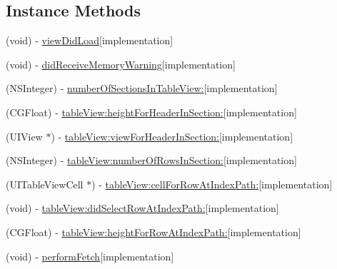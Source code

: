 \subsection*{Instance Methods}
\begin{DoxyCompactItemize}
\item 
(void) -\/ \hyperlink{interface_medikamente_view_controller_ad495861d765867a533e7f57bb0c7ddeb}{view\+Did\+Load}{\ttfamily  \mbox{[}implementation\mbox{]}}
\item 
(void) -\/ \hyperlink{interface_medikamente_view_controller_a272c41cc6dc63b30f8714e8e787748e0}{did\+Receive\+Memory\+Warning}{\ttfamily  \mbox{[}implementation\mbox{]}}
\item 
(N\+S\+Integer) -\/ \hyperlink{interface_medikamente_view_controller_a1917223546d3ea554f347dfe4c6abf9f}{number\+Of\+Sections\+In\+Table\+View\+:}{\ttfamily  \mbox{[}implementation\mbox{]}}
\item 
(C\+G\+Float) -\/ \hyperlink{interface_medikamente_view_controller_a1fdfccfb526b24d462ece625af788b61}{table\+View\+:height\+For\+Header\+In\+Section\+:}{\ttfamily  \mbox{[}implementation\mbox{]}}
\item 
(U\+I\+View $\ast$) -\/ \hyperlink{interface_medikamente_view_controller_ab2f59dbc2ceab3b47584584cf67bd88b}{table\+View\+:view\+For\+Header\+In\+Section\+:}{\ttfamily  \mbox{[}implementation\mbox{]}}
\item 
(N\+S\+Integer) -\/ \hyperlink{interface_medikamente_view_controller_a814c4474f1de97789160edf42be07675}{table\+View\+:number\+Of\+Rows\+In\+Section\+:}{\ttfamily  \mbox{[}implementation\mbox{]}}
\item 
(U\+I\+Table\+View\+Cell $\ast$) -\/ \hyperlink{interface_medikamente_view_controller_acfb639b65d34f1019a28065a8aaa8858}{table\+View\+:cell\+For\+Row\+At\+Index\+Path\+:}{\ttfamily  \mbox{[}implementation\mbox{]}}
\item 
(void) -\/ \hyperlink{interface_medikamente_view_controller_af096d0035878c4de7bf01051c6eeae91}{table\+View\+:did\+Select\+Row\+At\+Index\+Path\+:}{\ttfamily  \mbox{[}implementation\mbox{]}}
\item 
(C\+G\+Float) -\/ \hyperlink{interface_medikamente_view_controller_a2980ba60a26329314b8825018955b454}{table\+View\+:height\+For\+Row\+At\+Index\+Path\+:}{\ttfamily  \mbox{[}implementation\mbox{]}}
\item 
(void) -\/ \hyperlink{interface_medikamente_view_controller_a467e2d6ba7b1501c5136c6c5ce483f43}{perform\+Fetch}{\ttfamily  \mbox{[}implementation\mbox{]}}
\item 

\end{DoxyCompactItemize}
